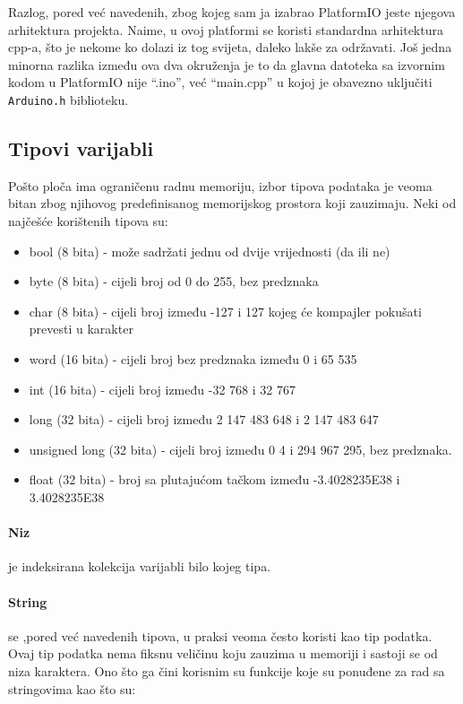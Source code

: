 \documentclass[../Document.tex]{subfiles}
\begin{document}
Razlog, pored već navedenih, zbog kojeg sam ja izabrao PlatformIO jeste njegova arhitektura projekta. Naime, u ovoj platformi se koristi standardna arhitektura cpp-a, što je nekome ko dolazi iz tog svijeta, daleko lakše za održavati. Još jedna minorna razlika između ova dva okruženja je to da glavna datoteka sa izvornim kodom u PlatformIO nije ``.ino'', već ``main.cpp'' u kojoj je obavezno uključiti \verb|Arduino.h| biblioteku.

\subsection{Tipovi varijabli}

Pošto ploča ima ograničenu radnu memoriju, izbor tipova podataka je veoma bitan zbog njihovog predefinisanog memorijskog prostora koji zauzimaju. Neki od najčešće korištenih tipova su:

\begin{itemize}
  \item bool (8 bita) - može sadržati jednu od dvije vrijednosti (da ili ne)
  \item byte (8 bita) - cijeli broj od 0 do 255, bez predznaka
  \item char (8 bita) - cijeli broj između -127 i 127 kojeg će kompajler pokušati prevesti u karakter
  \item word (16 bita) - cijeli broj bez predznaka između 0 i 65 535
  \item int (16 bita) - cijeli broj između -32 768 i 32 767
  \item long (32 bita) - cijeli broj između 2 147 483 648 i 2 147 483 647
  \item unsigned long (32 bita) - cijeli broj između 0 4 i 294 967 295, bez predznaka.
  \item float (32 bita) -  broj sa plutajućom tačkom između -3.4028235E38 i 3.4028235E38
\end{itemize}

\paragraph{Niz} je indeksirana kolekcija varijabli bilo kojeg tipa.

\paragraph{String} se ,pored već navedenih tipova, u praksi veoma često koristi kao tip podatka. Ovaj tip podatka nema fiksnu veličinu koju zauzima u memoriji i sastoji se od niza karaktera. Ono što ga čini korisnim su funkcije koje su ponuđene za rad sa stringovima kao što su:
\end{document}
